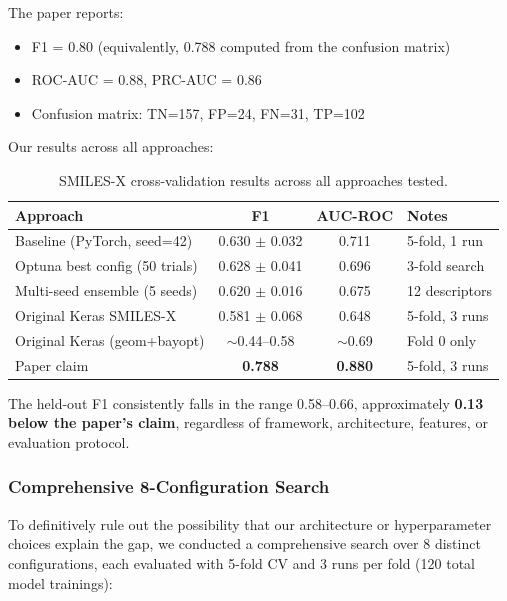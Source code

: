 \documentclass[11pt,a4paper]{article}
\begin{document}
The paper reports:
\begin{itemize}[nosep]
    \item F1 = 0.80 (equivalently, 0.788 computed from the confusion matrix)
    \item ROC-AUC = 0.88, PRC-AUC = 0.86
    \item Confusion matrix: TN=157, FP=24, FN=31, TP=102
\end{itemize}

Our results across all approaches:

\begin{table}[H]
\centering
\caption{SMILES-X cross-validation results across all approaches tested.}
\label{tab:smilesx_cv}
\begin{tabular}{lccl}
\toprule
Approach & F1 & AUC-ROC & Notes \\
\midrule
Baseline (PyTorch, seed=42) & 0.630 $\pm$ 0.032 & 0.711 & 5-fold, 1 run \\
Optuna best config (50 trials) & 0.628 $\pm$ 0.041 & 0.696 & 3-fold search \\
Multi-seed ensemble (5 seeds) & 0.620 $\pm$ 0.016 & 0.675 & 12 descriptors \\
Original Keras SMILES-X & 0.581 $\pm$ 0.068 & 0.648 & 5-fold, 3 runs \\
Original Keras (geom+bayopt) & $\sim$0.44--0.58 & $\sim$0.69 & Fold 0 only \\
\midrule
\rowcolor{lightyellow}
Paper claim & \textbf{0.788} & \textbf{0.880} & 5-fold, 3 runs \\
\bottomrule
\end{tabular}
\end{table}

The held-out F1 consistently falls in the range 0.58--0.66, approximately \textbf{0.13 below the paper's claim}, regardless of framework, architecture, features, or evaluation protocol.

\subsubsection{Comprehensive 8-Configuration Search}
\label{sec:comprehensive_search}

To definitively rule out the possibility that our architecture or hyperparameter choices explain the gap, we conducted a comprehensive search over 8 distinct configurations, each evaluated with 5-fold CV and 3 runs per fold (120 total model trainings):
\end{document}
